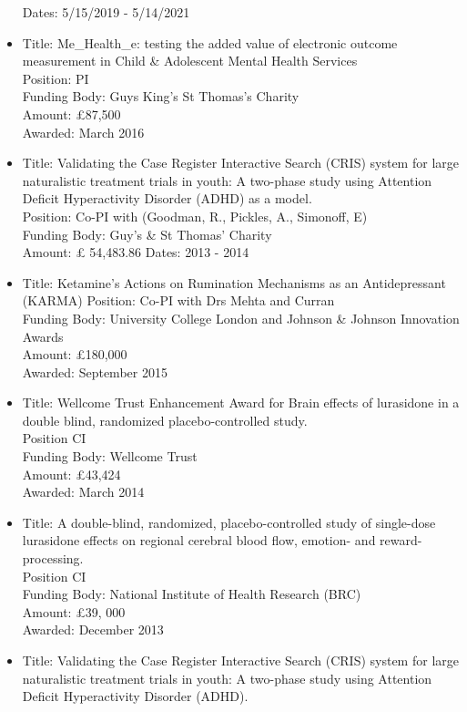 \documentclass[
]{article}
\begin{document}
\begin{itemize}
  Dates: 5/15/2019 - 5/14/2021
\item
  Title: Me\_Health\_e: testing the added value of electronic outcome
  measurement in Child \& Adolescent Mental Health Services\\
  Position: PI\\
  Funding Body: Guys King's St Thomas's Charity\\
  Amount: £87,500\\
  Awarded: March 2016
\item
  Title: Validating the Case Register Interactive Search (CRIS) system
  for large naturalistic treatment trials in youth: A two-phase study
  using Attention Deficit Hyperactivity Disorder (ADHD) as a model.\\
  Position: Co-PI with (Goodman, R., Pickles, A., Simonoff, E)\\
  Funding Body: Guy's \& St Thomas' Charity\\
  Amount: £ 54,483.86 Dates: 2013 - 2014
\item
  Title: Ketamine's Actions on Rumination Mechanisms as an
  Antidepressant (KARMA) Position: Co-PI with Drs Mehta and Curran\\
  Funding Body: University College London and Johnson \& Johnson
  Innovation Awards\\
  Amount: £180,000\\
  Awarded: September 2015
\item
  Title: Wellcome Trust Enhancement Award for Brain effects of
  lurasidone in a double blind, randomized placebo-controlled study.\\
  Position CI\\
  Funding Body: Wellcome Trust\\
  Amount: £43,424\\
  Awarded: March 2014
\item
  Title: A double-blind, randomized, placebo-controlled study of
  single-dose lurasidone effects on regional cerebral blood flow,
  emotion- and reward-processing.\\
  Position CI\\
  Funding Body: National Institute of Health Research (BRC)\\
  Amount: £39, 000\\
  Awarded: December 2013
\item
  Title: Validating the Case Register Interactive Search (CRIS) system
  for large naturalistic treatment trials in youth: A two-phase study
  using Attention Deficit Hyperactivity Disorder (ADHD).\\

\end{itemize}
\end{document}
